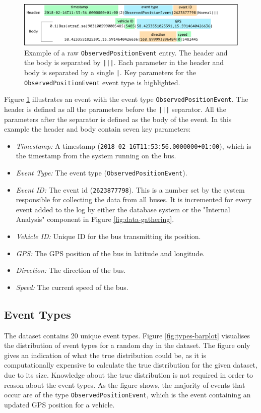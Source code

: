 \begin{figure}[ht!]
    \centering
    \includegraphics[width=\textwidth]{figures/data-example-1}
    \caption{Example of a raw \texttt{ObservedPositionEvent} entry.
    The header and the body is separated by \texttt{|||}.
    Each parameter in the header and body is separated by a single \texttt{|}.
    Key parameters for the \texttt{ObservedPositionEvent} event type is highlighted.}
    \label{fig:data-ex-1}
\end{figure}

Figure \ref{fig:data-ex-1} illustrates an event with the event type \texttt{ObservedPositionEvent}.
The header is defined as all the parameters before the \texttt{|||} separator.
All the parameters after the separator is defined as the body of the event.
In this example the header and body contain seven key parameters: 
\begin{itemize}
    \item \textit{Timestamp:} A timestamp (\texttt{2018-02-16T11:53:56.0000000+01:00}), which is the timestamp from the system running on the bus.
    \item \textit{Event Type:} The event type (\texttt{ObservedPositionEvent}).
    \item \textit{Event ID:} The event id (\texttt{2623877798}). This is a number set by the system responsible for collecting the data from all buses.
    It is incremented for every event added to the log by either the database system or the "Internal Analysis" component in Figure \ref{fig:data-gathering}.
    \item \textit{Vehicle ID:} Unique ID for the bus transmitting its position.
    \item \textit{GPS:} The GPS position of the bus in latitude and longitude.
    \item \textit{Direction:} The direction of the bus.
    \item \textit{Speed:} The current speed of the bus.
\end{itemize}

\subsection{Event Types}
The dataset contains 20 unique event types.
Figure \ref{fig:types-barplot} visualises the distribution of event types for a random day  in the dataset.
The figure only gives an indication of what the true distribution could be, as it is computationally expensive to calculate the true distribution for the given dataset, due to its size.
Knowledge about the true distribution is not required in order to reason about the event types.
As the figure shows, the majority of events that occur are of the type \texttt{ObservedPositionEvent}, which is the event containing an updated GPS position for a vehicle.


